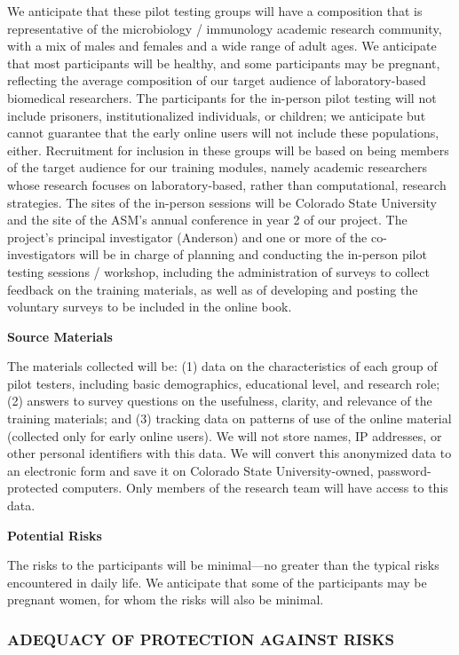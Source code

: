 \documentclass[pdftex,english,11.5pt,parskip=half]{scrartcl}
\begin{document}
We anticipate that these pilot testing groups will have a composition that is
representative of the microbiology / immunology academic research community, with a mix of males and females and a wide range of adult ages. We anticipate that most participants will be healthy, and some participants may be pregnant, reflecting the average composition of our target audience of laboratory-based biomedical researchers. The participants for the in-person pilot testing will not include prisoners, institutionalized
individuals, or children; we anticipate but cannot guarantee that the early online users will not include these populations, either. Recruitment for inclusion in these groups will be based on being members of
the target audience for our training modules, namely academic researchers whose research
focuses on laboratory-based, rather than computational, research strategies.
The sites of the in-person sessions will be Colorado State University and the site of the
ASM's annual conference in year 2 of our project. The project's principal investigator
(Anderson) and one or more of the co-investigators will be in charge of planning and 
conducting the in-person pilot testing sessions / workshop, including the administration of 
surveys to collect feedback on the training materials, as well as of developing and posting the voluntary surveys to be included in the online book. 

\textbf{Source Materials}

The materials collected will be: (1) data on the characteristics of each group 
of pilot testers, including basic demographics, educational level, and research role; 
(2) answers to survey questions on the usefulness, clarity,
and relevance of the training materials; and (3) tracking data on patterns of use 
of the online material (collected only for early online users). We will not store 
names, IP addresses, or other personal identifiers with this data. We will convert
this anonymized data to an electronic form and save it on Colorado State University-owned, password-protected computers. Only members of the research team will have access to 
this data. 

\textbf{Potential Risks}

The risks to the participants will be minimal---no greater than the typical risks encountered in daily life. We anticipate that some of the participants may be pregnant women, for whom the risks will also be minimal.

\subsubsection*{ADEQUACY OF PROTECTION AGAINST RISKS}
\end{document}
